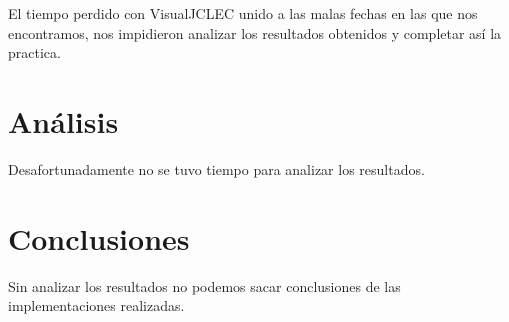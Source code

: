 \documentclass[a4paper,12pt,titlepage]{article}
\begin{document}
El tiempo perdido con VisualJCLEC unido a las malas fechas en las que nos encontramos, nos impidieron analizar los resultados obtenidos y completar así la practica.

\section{Análisis}

Desafortunadamente no se tuvo tiempo para analizar los resultados.
	 
\section{Conclusiones}

Sin analizar los resultados no podemos sacar conclusiones de las implementaciones realizadas. 

\newpage


\end{document}
